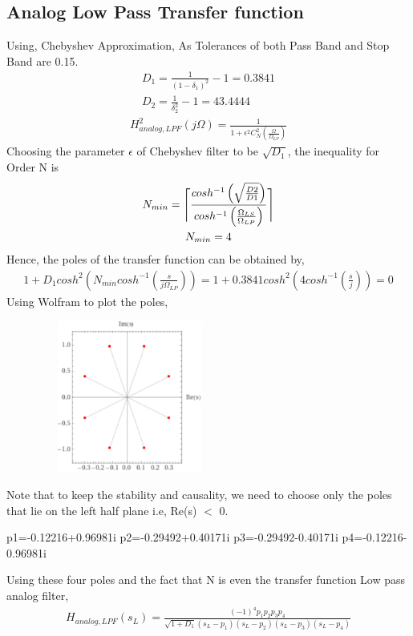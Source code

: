 \documentclass[12pt]{article}
\begin{document}
	\subsection{Analog Low Pass Transfer function}
	\color{black}
	Using, Chebyshev Approximation, As Tolerances of both Pass Band and Stop Band are 0.15.
	\begin{gather*}
		D_1 = \frac{1}{(1-\delta_1)^2} - 1 = 0.3841\\
		D_2 = \frac{1}{\delta_2^2} - 1 = 43.4444
	\end{gather*}
	\begin{gather*}
		H_{analog,LPF}^2(j\Omega) = \frac{1}{1+\epsilon^2C_{N}^2(\frac{\Omega}{\Omega_{LP}})} 
	\end{gather*}
	Choosing the parameter $\epsilon$ of Chebyshev filter to be $\sqrt{D_1}$, the inequality for Order N is 
	\begin{gather*}
		N_{min} = \ceil[\Bigg]{ \frac{cosh^{-1}\left(\sqrt{\frac{D2}{D1}}\right)}{cosh^{-1}\left(\frac{\Omega_{LS}}{\Omega_{LP}}\right)}} \\
		N_{min} = 4
	\end{gather*}
	Hence, the poles of the transfer function can be obtained by,
	\begin{gather*}
		1 + D_1cosh^2\left(N_{min}cosh^{-1}\left(\frac{s}{j\Omega_{LP}}\right)\right) = 1 + 0.3841cosh^2\left(4cosh^{-1}\left(\frac{s}{j}\right)\right) = 0
	\end{gather*}
	Using Wolfram to plot the poles,
	\begin{figure}[H]
		\centering
		\includegraphics[width = 6cm, height= 5cm]{Chebyshevpoles.png}
	\end{figure}
	\noindent Note that to keep the stability and causality, we need to choose only the poles that lie on the left half plane i.e, Re(s) $<$ 0.

	\begin{verbatim*}
		p1=-0.12216+0.96981i
		p2=-0.29492+0.40171i
		p3=-0.29492-0.40171i
		p4=-0.12216-0.96981i
	\end{verbatim*}
	Using these four poles and the fact that N is even the transfer function Low pass analog filter,
	\begin{gather*}
		H_{analog,LPF}(s_{L}) = \frac{(-1)^4p_1p_2p_3p_4}{\sqrt{1 + D_1}(s_L - p_1)(s_L - p_2)(s_L - p_3)(s_L - p_4)}
	\end{gather*}
	
\end{document}
